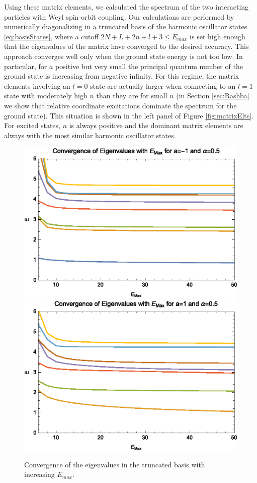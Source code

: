 \documentclass[%
 preprint,
 amsmath,amssymb,
 aps,
]{revtex4-1}
\begin{document}
Using these matrix elements, we calculated the spectrum of the two interacting particles with Weyl spin-orbit coupling. Our calculations are performed by numerically diagonalizing in a truncated basis of the harmonic oscillator states \eqref{eq:basisStates}, where a cutoff $2N+L+2n+l+3\leq E_{max}$ is set high enough that the eigenvalues of the matrix have converged to the desired accuracy.  This approach converges well only when the ground state energy is not too low. In particular, for $a$ positive but very small the principal quantum number of the ground state is increasing from negative infinity. For this regime, the matrix elements involving an $l=0$ state are actually larger when connecting to an $l=1$ state with moderately high $n$ than they are for small $n$ (in Section \ref{sec:Rashba} we show that relative coordinate excitations dominate the spectrum for the ground state). This situation is shown in the left panel of Figure \ref{fig:matrixElts}. For excited states, $n$ is always positive and the dominant matrix elements are always with the most similar harmonic oscillator states.

\begin{figure}
\includegraphics[width=0.5\linewidth]{Figures/WeylConvM1}\nobreak
\includegraphics[width=0.5\linewidth]{Figures/WeylConvP1}
\caption{\label{fig:WeylConvergence} Convergence of the eigenvalues in the truncated basis with increasing $E_{max}$.} 
\end{figure}
\end{document}
